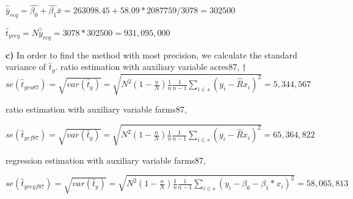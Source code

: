\documentclass[11pt]{article}
\begin{document}
$\hat{\bar{y}}_{req} = \hat{\beta_0} + \hat{\beta_1}\bar{x} =263098.45 +  58.09 * 2087759/3078 =   302500$

$\hat{t}_{{yreq}} = N\hat{\bar{y}}_{req} =3078 * 302500 = 931,095,000 $

\textbf{c)}
In order to find the method with most precision, we calculate the standard variance of $ \hat{t}_y$.
ratio estimation with auxiliary variable acres87,
†
$ se(\hat{t}_{yra87}) = \sqrt{var(\hat{t}_y)} = \sqrt{N^2(1-\frac{n}{N})\frac{1}{n}\frac{1}{n-1}\sum_{i\in s}^{}{(y_i - \hat{R}x_i)^2}} = 5,344,567$

ratio estimation with auxiliary variable farms87,

$ se(\hat{t}_{yrf87}) = \sqrt{var(\hat{t}_y)} = \sqrt{N^2(1-\frac{n}{N})\frac{1}{n}\frac{1}{n-1}\sum_{i\in s}^{}{(y_i - \hat{R}x_i)^2}} = 65,364,822$

regression estimation with auxiliary variable farms87,

$ se(\hat{t}_{yregf87}) = \sqrt{var(\hat{t}_y)} = \sqrt{N^2(1-\frac{n}{N})\frac{1}{n}\frac{1}{n-1}\sum_{i\in s}^{}{(y_i - \beta_0 - \beta_1*x_i)^2}} = 58,065,813$
\end{document}

